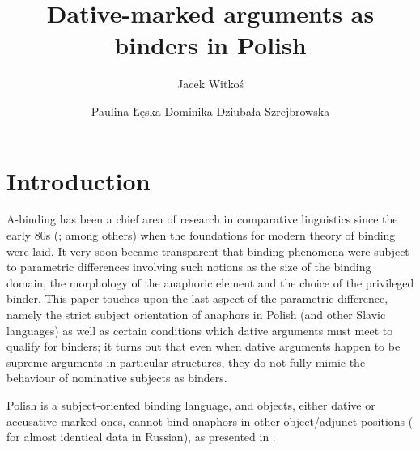 \documentclass[output=paper,modfonts,nonflat
]{langsci/langscibook}
\author{
Jacek Witkoś\affiliation{Adam Mickiewicz University in Poznań}\orcid{ 0000-0001-6462-3117}\and 
 Paulina Łęska\affiliation{Adam Mickiewicz University in Poznań}\orcid{0000-0002-8817-9409}\lastand 
 Dominika Dziubała-Szrejbrowska\affiliation{Adam Mickiewicz University in Poznań}}
\title{Dative-marked arguments as binders in Polish}
\begin{document}
\maketitle


\section{Introduction}\label{sec:witkos:s1}

\sloppy A-binding has been a chief area of research in comparative linguistics since the early 80s (\citealt{chomsky1981,chomsky1986,manzini1987,bellettirizzi1988,rappaport1986,willim1989,burzio1996,hellan1988,progovac1992,progovac1993,avrutin1994}; among others) when the foundations for modern theory of binding were laid. It very soon became transparent that binding phenomena were subject to parametric differences involving such notions as the size of the binding domain, the morphology of the anaphoric element and the choice of the privileged binder. This paper touches upon the last aspect of the parametric difference, namely the strict subject orientation of anaphors in Polish (and other Slavic languages) as well as certain conditions which dative arguments must meet to qualify for binders; it turns out that even when dative arguments happen to be supreme arguments in particular structures, they do not fully mimic the behaviour of nominative subjects as binders.

Polish is a subject-oriented binding language, and objects, either dative or accusative-marked ones, cannot bind anaphors in other object/adjunct positions (\citealt{willim1989,reinders1991,rappaport1986} for almost identical data in Russian), as presented in .
\end{document}
